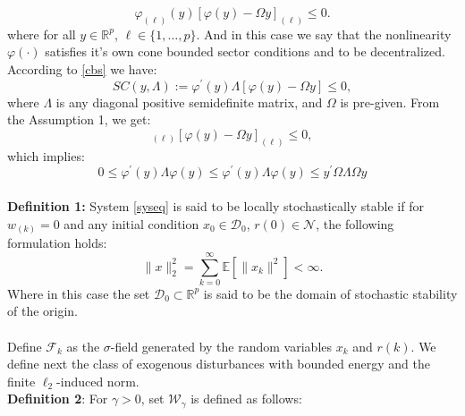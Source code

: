 \documentclass[conference]{IEEEtran}
\begin{document}
\begin{equation}\label{cbs}
\varphi_{(\ell)}(y)[\varphi(y)-\varOmega y ]_{(\ell)}\leq 0.
\end{equation}
where for all $y\in\mathbb{R}^{p}$, $\ell \in\{1,\dots,p\}$. And in this case we say that the nonlinearity $\varphi(\cdot) $ satisfies it's own cone bounded sector conditions and to be decentralized. According to \eqref{cbs} we have:
\begin{equation}\label{scieq}
	SC(y,\varLambda):= \varphi^{\mathrm{'}}(y)\varLambda[\varphi(y)-\varOmega y]\leq0,
\end{equation}
where $\varLambda$ is any diagonal positive semidefinite matrix, and $\varOmega$ is pre-given. From the Assumption 1, we get:
\begin{equation}
[\varOmega y]_{(\ell)}[\varphi(y)-\varOmega y]_{(\ell)}\leq0,
\end{equation}
which implies:
\begin{equation}
 0\leq\varphi^{\mathrm{'}}(y)\varLambda\varphi(y) \leq \varphi^{\mathrm{'}}(y)\varLambda\varphi(y) \leq y^{\mathrm{'}}\varOmega\varLambda\varOmega y
\end{equation}\\
\textbf{Definition 1:} System \eqref{syseq} is said to be locally stochastically stable if for $w_(k)=0$ and any initial condition $x_0\in \mathcal{D}_0$, $r(0)\in \mathcal{N}$, the following formulation holds:
\begin{equation}
	\|x\|^2_2=\sum_{k=0}^{\infty}\mathbb{E}[\|x_k\|^2]<\infty.
\end{equation} 
Where in this case the set $\mathcal{D}_0 \subset \mathbb{R}^{p}$ is said to be the domain of stochastic stability of the origin. \\
\\
Define $\mathcal{F}_k$ as the $\sigma$-field generated by the random variables $x_k$ and $r(k)$. We define next the class of exogenous disturbances with bounded energy and the finite $\ell_2$-induced norm.
\\
\textbf{Definition 2}: For $\gamma>0$, set $\mathcal{W}_{\gamma}$ is defined as follows:
\end{document}
